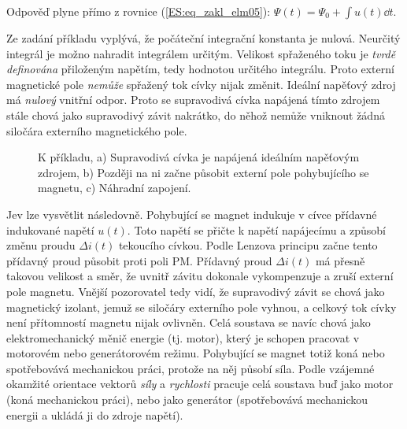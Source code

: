     Odpověď plyne přímo z rovnice (\ref{ES:eq_zakl_elm05}): \(\Psi(t) = \Psi_0 +\int u(t)\dd{t}\).
    
    Ze zadání příkladu vyplývá, že počáteční integrační konstanta je nulová. Neurčitý integrál je
    možno nahradit integrálem určitým. Velikost spřaženého toku je \emph{tvrdě definována}
    přiloženým napětím, tedy hodnotou určitého integrálu. Proto externí magnetické pole 
    \emph{nemůže} spřažený tok cívky nijak změnit. Ideální napěťový zdroj má \emph{nulový} 
    vnitřní odpor. Proto se supravodivá cívka napájená tímto zdrojem stále chová jako supravodivý
    závit nakrátko, do něhož nemůže vniknout žádná siločára externího magnetického pole.
    
    \begin{figure}[ht!]
      \centering  
      \hspace{1em}
      \newline               
      \caption{K příkladu, a) Supravodivá cívka je napájená ideálním napěťovým zdrojem, b) Později
               na ni začne působit externí pole pohybujícího se magnetu, c) Náhradní zapojení.} 
      \label{teo:fig042}
    \end{figure}
  
    Jev lze vysvětlit následovně. Pohybující se magnet indukuje v cívce přídavné indukované napětí
    \(u(t)\). Toto napětí se přičte k napětí napájecímu a způsobí změnu proudu \(\Delta i(t)\)
    tekoucího cívkou. Podle Lenzova principu začne tento přídavný proud působit proti poli PM.
    Přídavný proud \(\Delta i(t)\) má přesně takovou velikost a směr, že uvnitř závitu dokonale
    vykompenzuje a zruší externí pole magnetu. Vnější pozorovatel tedy vidí, že supravodivý závit se
    chová jako magnetický izolant, jemuž se siločáry externího pole vyhnou, a celkový tok cívky není
    přítomností magnetu nijak ovlivněn. Celá soustava se navíc chová jako elektromechanický měnič
    energie (tj. motor), který je schopen pracovat v motorovém nebo generátorovém režimu. Pohybující
    se magnet totiž koná nebo spotřebovává mechanickou práci, protože na něj působí síla. Podle
    vzájemné okamžité orientace vektorů \emph{síly} a \emph{rychlosti} pracuje celá soustava buď
    jako motor (koná mechanickou práci), nebo jako generátor (spotřebovává mechanickou energii a
    ukládá ji do zdroje napětí).

